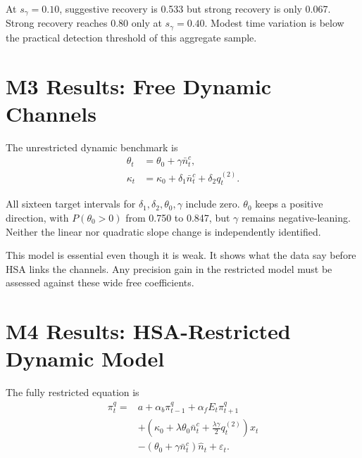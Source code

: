 \documentclass[11pt]{article}
\newcommand{\Nbar}{\bar n}
\newcommand{\Nhat}{\hat n}
\begin{document}
\begin{table}[H]
\centering
\caption{Propagated-state recovery of $\gamma$}

\end{table}

At $s_\gamma=0.10$, suggestive recovery is 0.533 but strong recovery is only 0.067. Strong
recovery reaches 0.80 only at $s_\gamma=0.40$. Modest time variation is below the practical
detection threshold of this aggregate sample.

\section{M3 Results: Free Dynamic Channels}

The unrestricted dynamic benchmark is
\begin{align}
\theta_t&=\theta_0+\gamma\Nbar_t^c,\\
\kappa_t&=\kappa_0+\delta_1\Nbar_t^c+\delta_2q_t^{(2)}.
\end{align}

\begin{table}[H]
\centering
\caption{Free-dynamic model; posterior mean and 95\% interval}
\resizebox{\linewidth}{!}{}
\end{table}

All sixteen target intervals for $\delta_1,\delta_2,\theta_0,\gamma$ include zero.
$\theta_0$ keeps a positive direction, with $P(\theta_0>0)$ from 0.750 to 0.847, but
$\gamma$ remains negative-leaning. Neither the linear nor quadratic slope change is
independently identified.

This model is essential even though it is weak. It shows what the data say before HSA links
the channels. Any precision gain in the restricted model must be assessed against these
wide free coefficients.

\section{M4 Results: HSA-Restricted Dynamic Model}

The fully restricted equation is
\begin{align}
\pi_t^q={}&a+\alpha_b\pi_{t-1}^q+\alpha_fE_t\pi_{t+1}^q\\
&+\left(\kappa_0+\lambda\theta_0\Nbar_t^c
+\frac{\lambda\gamma}{2}q_t^{(2)}\right)x_t\\
&-(\theta_0+\gamma\Nbar_t^c)\Nhat_t+\varepsilon_t.
\end{align}
\end{document}
